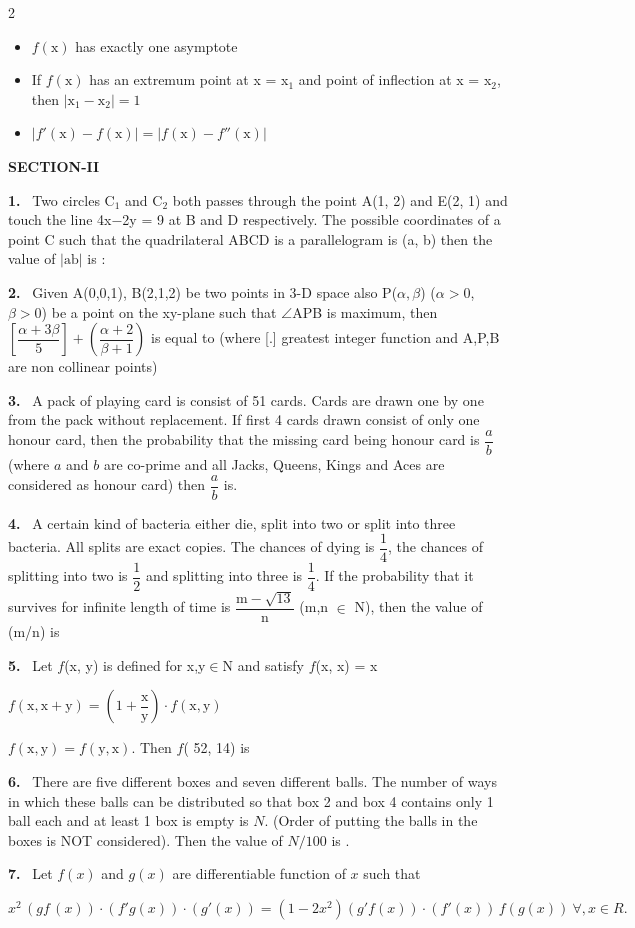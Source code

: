 \documentclass[10pt]{extarticle}
\newcommand{\sect}[1]{\par\smallskip\noindent\textbf{#1}\par}
\newcommand{\qn}[1]{\par\smallskip\noindent\textbf{#1.}~}
\newenvironment{qoptions}{\begin{itemize}[leftmargin=1.8em,itemsep=1pt,topsep=2pt,label={}]}{\end{itemize}}
\newcommand{\opt}[2]{\item[(#1)] #2}
\begin{document}
\begin{multicols}{2}
\begin{qoptions}
\opt{B}{$f(\mathrm x)$ has exactly one asymptote}
\opt{C}{If $f(\mathrm x)$ has an extremum point at x = x$_1$ and point of inflection at x = x$_2$, then $|\mathrm x_1-\mathrm x_2|=1$}
\opt{D}{$|f'(\mathrm x)-f(\mathrm x)|=|f(\mathrm x)-f''(\mathrm x)|$}
\end{qoptions}
\sect{SECTION-II}
\qn{1} Two circles C$_1$ and C$_2$ both passes through the point A(1, 2) and E(2, 1) and touch the line 4x$-$2y = 9 at B and D respectively. The possible coordinates of a point C such that the quadrilateral ABCD is a parallelogram is (a, b) then the value of $|\mathrm{ab}|$ is :
\qn{2} Given A(0,0,1), B(2,1,2) be two points in 3-D space also P($\alpha,\beta$) ($\alpha>0$, $\beta>0$) be a point on the xy-plane such that $\angle$APB is maximum, then $\left[\dfrac{\alpha+3\beta}5\right]+\left(\dfrac{\alpha+2}{\beta+1}\right)$ is equal to (where [.] greatest integer function and A,P,B are non collinear points)
\qn{3} A pack of playing card is consist of 51 cards. Cards are drawn one by one from the pack without replacement. If first 4 cards drawn consist of only one honour card, then the probability that the missing card being honour card is $\dfrac ab$ (where $a$ and $b$ are co-prime and all Jacks, Queens, Kings and Aces are considered as honour card) then $\dfrac ab$ is\underline{\hspace{1.5cm}}.
\qn{4} A certain kind of bacteria either die, split into two or split into three bacteria. All splits are exact copies. The chances of dying is $\dfrac14$, the chances of splitting into two is $\dfrac12$ and splitting into three is $\dfrac14$. If the probability that it survives for infinite length of time is $\dfrac{\mathrm m-\sqrt{13}}{\mathrm n}$ (m,n $\in$ N), then the value of (m/n) is
\qn{5} Let $f$(x, y) is defined for x,y$\in$N and satisfy $f$(x, x) = x\par
$f(\mathrm x,\mathrm x+\mathrm y)=\left(1+\dfrac{\mathrm x}{\mathrm y}\right)\cdot f(\mathrm x,\mathrm y)$\par
$f(\mathrm x,\mathrm y)=f(\mathrm y,\mathrm x)$. Then $f$( 52, 14) is
\qn{6} There are five different boxes and seven different balls. The number of ways in which these balls can be distributed so that box 2 and box 4 contains only 1 ball each and at least 1 box is empty is $N$. (Order of putting the balls in the boxes is NOT considered). Then the value of $N/100$ is \underline{\hspace{1.5cm}}.
\qn{7} Let $f(x)$ and $g(x)$ are differentiable function of $x$ such that\par
$x^2\,(gf\,(x))\cdot(f'g(x))\cdot(g'(x))=(1-2x^2)(g'f(x))\cdot(f'(x))\,f(g(x))\ \forall,x\in R.$\par

\end{multicols}
\end{document}

